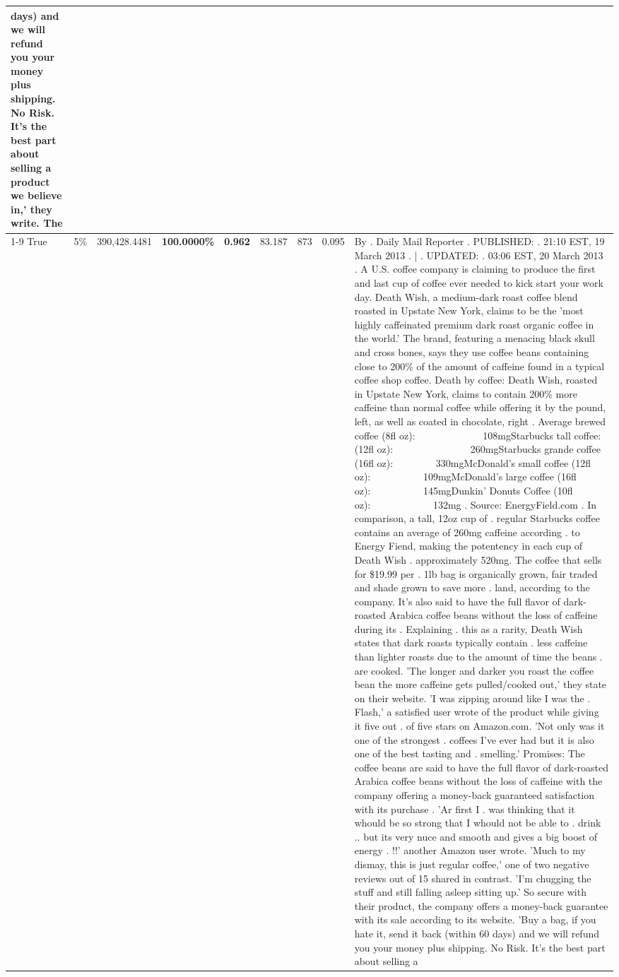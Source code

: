 \begin{table}[H]
{\begin{tabular}{lllrlllll}
days) and we will refund you your money plus shipping. No Risk. It’s the best part about selling a product we believe in,' they write. The \\
\cline{1-9} \cline{2-9}
True & 5\% & 390,428.4481 & \bfseries \color{red} 100.0000\% & \bfseries \color{red} 0.962 & 83.187 & 873 & 0.095 & By . Daily Mail Reporter . PUBLISHED: . 21:10 EST, 19 March 2013 . | . UPDATED: . 03:06 EST, 20 March 2013 . A U.S. coffee company is claiming to produce the first and last cup of coffee ever needed to kick start your work day. Death Wish, a medium-dark roast coffee blend roasted in Upstate New York, claims to be the 'most highly caffeinated premium dark roast organic coffee in the world.' The brand, featuring a menacing black skull and cross bones, says they use coffee beans containing close to 200\% of the amount of caffeine found in a typical coffee shop coffee. Death by coffee: Death Wish, roasted in Upstate New York, claims to contain 200\% more caffeine than normal coffee while offering it by the pound, left, as well as coated in chocolate, right . Average brewed coffee (8fl oz):              108mgStarbucks tall coffee: (12fl oz):                260mgStarbucks grande coffee (16fl oz):         330mgMcDonald's small coffee (12fl oz):           109mgMcDonald's large coffee (16fl oz):           145mgDunkin' Donuts Coffee (10fl oz):             132mg . Source: EnergyField.com . In comparison, a tall, 12oz cup of . regular Starbucks coffee contains an average of 260mg caffeine according . to Energy Fiend, making the potentency in each cup of Death Wish . approximately 520mg. The coffee that sells for \$19.99 per . 1lb bag is organically grown, fair traded and shade grown to save more . land, according to the company. It's also said to have the full flavor of dark-roasted Arabica coffee beans without the loss of caffeine during its . Explaining . this as a rarity, Death Wish states that dark roasts typically contain . less caffeine than lighter roasts due to the amount of time the beans . are cooked. 'The longer and darker you roast the coffee bean the more caffeine gets pulled/cooked out,' they state on their website. 'I was zipping around like I was the . Flash,' a satisfied user wrote of the product while giving it five out . of five stars on Amazon.com. 'Not only was it one of the strongest . coffees I've ever had but it is also one of the best tasting and . smelling.’ Promises: The coffee beans are said to have the full flavor of dark-roasted Arabica coffee beans without the loss of caffeine with the company offering a money-back guaranteed satisfaction with its purchase . 'Ar first I . was thinking that it whould be so strong that I whould not be able to . drink .. but its very nuce and smooth and gives a big boost of energy . !!' another Amazon user wrote. 'Much to my dismay, this is just regular coffee,' one of two negative reviews out of 15 shared in contrast. 'I'm chugging the stuff and still falling asleep sitting up.' So secure with their product, the company offers a money-back guarantee with its sale according to its website. 'Buy a bag, if you hate it, send it back (within 60 days) and we will refund you your money plus shipping. No Risk. It’s the best part about selling a 
\end{tabular}}
\end{table}
